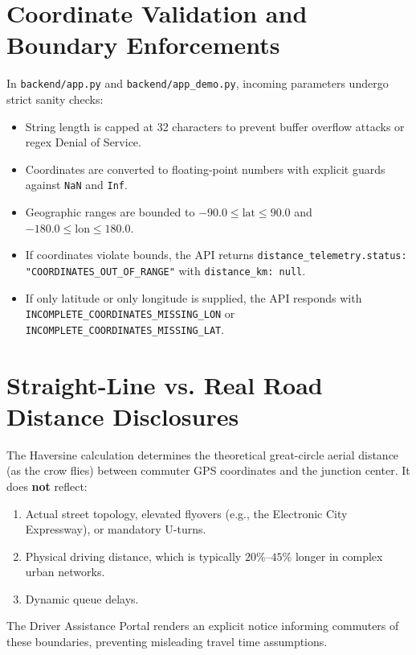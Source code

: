\section{Coordinate Validation and Boundary Enforcements}
In \texttt{backend/app.py} and \texttt{backend/app\_demo.py}, incoming parameters undergo strict sanity checks:
\begin{itemize}[leftmargin=*]
    \item String length is capped at 32 characters to prevent buffer overflow attacks or regex Denial of Service.
    \item Coordinates are converted to floating-point numbers with explicit guards against \texttt{NaN} and \texttt{Inf}.
    \item Geographic ranges are bounded to $-90.0 \le \text{lat} \le 90.0$ and $-180.0 \le \text{lon} \le 180.0$.
    \item If coordinates violate bounds, the API returns \texttt{distance\_telemetry.status: "COORDINATES\_OUT\_OF\_RANGE"} with \texttt{distance\_km: null}.
    \item If only latitude or only longitude is supplied, the API responds with \texttt{INCOMPLETE\_COORDINATES\_MISSING\_LON} or \texttt{INCOMPLETE\_COORDINATES\_MISSING\_LAT}.
\end{itemize}

\section{Straight-Line vs. Real Road Distance Disclosures}
\begin{conceptbox}
The Haversine calculation determines the theoretical great-circle aerial distance (as the crow flies) between commuter GPS coordinates and the junction center. It does \textbf{not} reflect:
\begin{enumerate}
    \item Actual street topology, elevated flyovers (e.g., the Electronic City Expressway), or mandatory U-turns.
    \item Physical driving distance, which is typically $20\%\text{--}45\%$ longer in complex urban networks.
    \item Dynamic queue delays.
\end{enumerate}
The Driver Assistance Portal renders an explicit notice informing commuters of these boundaries, preventing misleading travel time assumptions.
\end{conceptbox}
